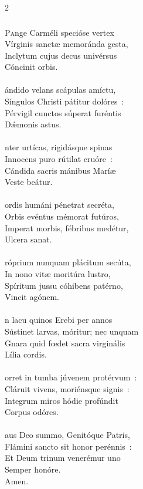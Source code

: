 \documentclass[9pt,twoside]{extarticle}
\begin{document}
\begin{multicols}{2}
{\subsubsection*{\center {}}
\lettrine{P}ange Carméli specióse vertex\\
Vírginis sanctæ memoránda gesta,\\
Inclytum cujus decus univérsus\\
Cóncinit orbis.\\
\\
ándido velans scápulas amíctu,\\
Síngulos Christi pátitur dolóres~:\\
Pérvigil cunctos súperat furéntis\\
Dǽmonis astus.\\
\\
nter urtícas, rigidásque spinas\\
Innocens puro rútilat cruóre~:\\
Cándida sacris mánibus Maríæ\\
Veste beátur.\\
\\
ordis humáni pénetrat secréta,\\
Orbis evéntus mémorat futúros,\\
Imperat morbis, fébribus medétur,\\
Ulcera sanat.\\
\\
róprium nunquam plácitum secúta,\\
In nono vitæ moritúra lustro,\\
Spíritum jussu cóhibens patérno,\\
Vincit agónem.\\
\\
n lacu quinos Erebi per annos\\
Sústinet larvas, móritur; nec unquam\\
Gnara quid fœdet sacra virginális\\
Lília cordis.\\
\\
orret in tumba júvenem protérvum~:\\
Cláruit vivens, moriénsque signis~:\\
Integrum miros hódie profúndit\\
Corpus odóres.\\
\\
aus Deo summo, Genitóque Patris,\\
Flámini sancto sit honor perénnis~:\\
Et Deum trinum venerémur uno\\
Semper honóre.\\
Amen.

}
\end{multicols}
\end{document}
